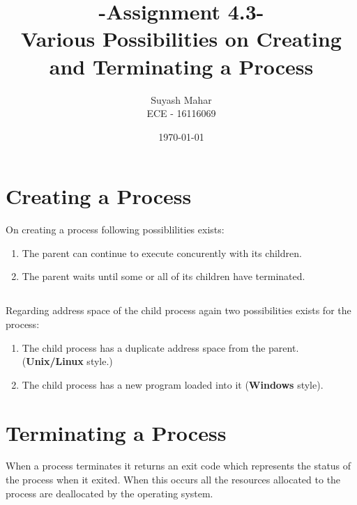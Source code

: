 \documentclass[a4,11pt]{article}
\title{-Assignment 4.3-\\Various Possibilities on Creating and
  Terminating a Process}
\author{Suyash Mahar \\
  ECE - 16116069 }
\date{\today}
\begin{document}
\maketitle

\section{Creating a Process}
On creating a process following possiblilities exists:
\begin{enumerate}
\item The parent can continue to execute concurently with its children.
\item The parent waits until some or all of its children have
  terminated.
\end{enumerate}

\subsection*{}

Regarding address space of the child process again two possibilities
exists for the process:

\begin{enumerate}
\item The child process has a duplicate address space from the parent. (\textbf{Unix/Linux} style.)
\item The child process has a new program loaded into it (\textbf{Windows} style).
\end{enumerate}

\section{Terminating a Process}
When a process terminates it returns an exit code which represents the
status of the process when it exited. When this occurs all the
resources allocated to the process are deallocated by the operating
system.
\end{document}

